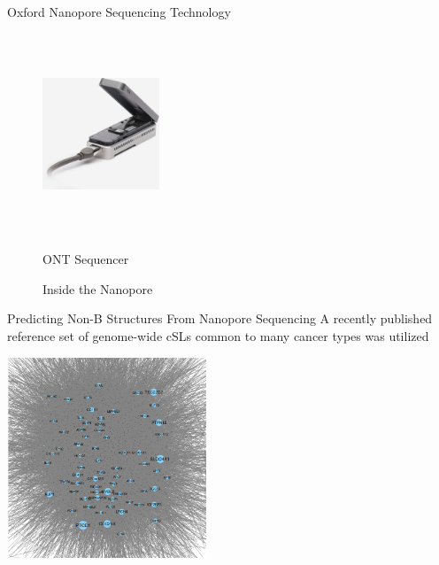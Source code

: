 \documentclass{beamer}
\begin{document}
	\begin{frame}{Oxford Nanopore Sequencing Technology}
		\centering
		\begin{figure}[!htb]
			\centering
			\begin{minipage}{.3\textwidth}
				\centering
				\includegraphics[width=3.5cm, height=6cm]{ont_machine.jpg}
				\caption{ONT Sequencer}
				\label{fig:prob1_6_2}
			\end{minipage}%
			\begin{minipage}{0.7\textwidth}
				\centering
				\caption{Inside the Nanopore}
				\label{fig:prob1_6_1}
			\end{minipage}
		\end{figure}
		
			
	\end{frame}

	\begin{frame}{Predicting Non-B Structures From Nanopore Sequencing}
		A recently published reference set of genome-wide cSLs common to many cancer types was utilized
		\begin{center}
				\includegraphics[width=6cm,height=6cm]{corenet.png}
		\end{center}
	\end{frame}
\end{document}
